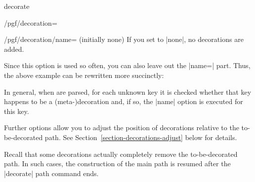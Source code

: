 \begin{pathoperation}{decorate}{}
\begin{key}{/pgf/decoration=}
\begin{key}{/pgf/decoration/name= (initially none)}
            If you set  to |none|, no decorations are added.
\begin{codeexample}[preamble={\usetikzlibrary{decorations.pathmorphing}}]
\end{codeexample}
            Since this option is used so often, you can also leave out the
            |name=| part. Thus, the above example can be rewritten more
            succinctly:
\begin{codeexample}[preamble={\usetikzlibrary{decorations.pathmorphing}}]
\end{codeexample}
            In general, when  are parsed, for each
            unknown key it is checked whether that key happens to be a
            (meta-)decoration and, if so, the |name| option is executed for
            this key.
        \end{key}

        Further options allow you to adjust the position of decorations
        relative to the to-be-decorated path. See
        Section~\ref{section-decorations-adjust} below for details.
    \end{key}

    Recall that some decorations actually completely remove the to-be-decorated
    path. In such cases, the construction of the main path is resumed after the
    |decorate| path command ends.
\begin{codeexample}[preamble={\usetikzlibrary{decorations.text}}]
\end{codeexample}


\end{pathoperation}
